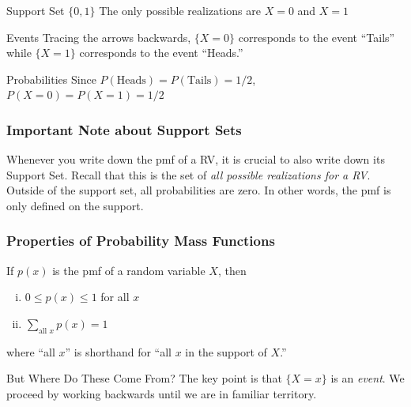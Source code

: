 \documentclass[handout]{beamer}
\begin{document}
\begin{frame}
\small
\begin{figure}
\centering
{}
\end{figure}
 
\begin{block}{Support Set $\{0,1\}$}
The only possible realizations are $X=0$ and $X=1$
\end{block}
 
\begin{block}{Events}
Tracing the arrows backwards, $\{X=0\}$ corresponds to the event ``Tails'' while $\{X=1\}$ corresponds to the event ``Heads.''
\end{block}
 
\begin{block}{Probabilities}
Since $P(\mbox{Heads}) = P(\mbox{Tails}) = 1/2$, $P(X=0) = P(X=1) = 1/2$
\end{block}

\end{frame}


\begin{frame}
\frametitle{Important Note about Support Sets}
Whenever you write down the pmf of a RV, it is \alert{crucial} to also write down its Support Set. Recall that this is the set of \alert{\emph{all possible realizations for a RV}}. Outside of the support set, all probabilities are zero. In other words, the pmf is \alert{only defined} on the support.

\end{frame}
\begin{frame}
\frametitle{Properties of Probability Mass Functions}

If $p(x)$ is the pmf of a random variable $X$, then
\begin{enumerate}[(i)]
	\item $0\leq p(x) \leq 1$ for all $x$ \vspace{1em}
	\item $\displaystyle \sum_{\mbox{all } x} p(x) = 1$
\end{enumerate}

\vspace{0.75em}
where ``all $x$'' is shorthand for ``all $x$ in the support of $X$.''


 

\vspace{2em}
\begin{alertblock}{But Where Do These Come From?}
The key point is that $\{X=x\}$ is an \emph{event}. We proceed by working backwards until we are in familiar territory.
\end{alertblock}

\end{frame}
\end{document}
